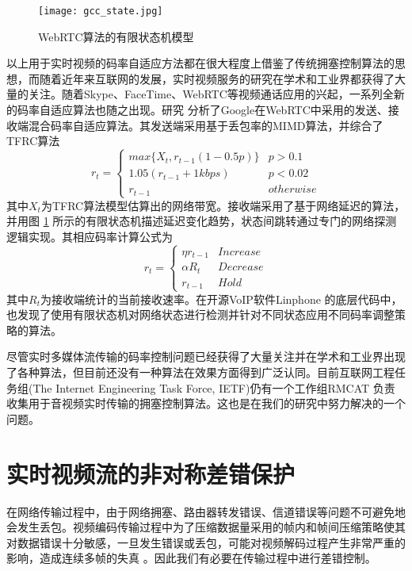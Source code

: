 \begin{figure}[htbp]
  \centering
  \texttt{[image: gcc\_state.jpg]}
  \caption{WebRTC算法的有限状态机模型}
  \label{fig:gcc_state}
\end{figure}

以上用于实时视频的码率自适应方法都在很大程度上借鉴了传统拥塞控制算法的思想，而随着近年来互联网的发展，实时视频服务的研究在学术和工业界都获得了大量的关注。随着Skype、FaceTime、WebRTC等视频通话应用的兴起，一系列全新的码率自适应算法也随之出现。研究 \cite{de2013experimental} 分析了Google在WebRTC中采用的发送、接收端混合码率自适应算法。其发送端采用基于丢包率的MIMD算法，并综合了TFRC算法
\begin{equation}
  r_t = \left\{ \begin{array}{ll}
    max\{X_t, r_{t-1}(1-0.5p)\} &   p > 0.1\\
    1.05(r_{t-1} + 1kbps)       &   p < 0.02\\
    r_{t-1}                     &   otherwise
  \end{array} \right.
\end{equation}
其中$X_t$为TFRC算法模型估算出的网络带宽。接收端采用了基于网络延迟的算法，并用图 \ref{fig:gcc_state} 所示的有限状态机描述延迟变化趋势，状态间跳转通过专门的网络探测逻辑实现。其相应码率计算公式为
\begin{equation}
  r_t = \left\{ \begin{array}{ll}
    \eta r_{t-1} &   Increase\\
    \alpha R_t   &   Decrease\\
    r_{t-1}      &   Hold
  \end{array} \right.
\end{equation}
其中$R_t$为接收端统计的当前接收速率。在开源VoIP软件Linphone \cite{website:linphone}的底层代码中，也发现了使用有限状态机对网络状态进行检测并针对不同状态应用不同码率调整策略的算法。

尽管实时多媒体流传输的码率控制问题已经获得了大量关注并在学术和工业界出现了各种算法，但目前还没有一种算法在效果方面得到广泛认同。目前互联网工程任务组(The Internet Engineering Task Force, IETF)仍有一个工作组RMCAT \cite{website:rmcat} 负责收集用于音视频实时传输的拥塞控制算法。这也是在我们的研究中努力解决的一个问题。


\section{实时视频流的非对称差错保护}
\label{section:fec_intro}
在网络传输过程中，由于网络拥塞、路由器转发错误、信道错误等问题不可避免地会发生丢包。视频编码传输过程中为了压缩数据量采用的帧内和帧间压缩策略使其对数据错误十分敏感，一旦发生错误或丢包，可能对视频解码过程产生非常严重的影响，造成连续多帧的失真 \cite{stockhammer2003h}。因此我们有必要在传输过程中进行差错控制。

